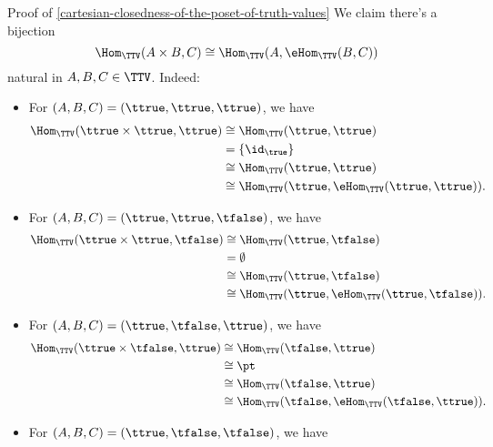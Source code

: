 \begin{Proof}{Proof of \cref{cartesian-closedness-of-the-poset-of-truth-values}}
    We claim there's a bijection
    \[
        \Hom_{\TTV}(A\times B,C)%
        \cong%
        \Hom_{\TTV}(A,\eHom_{\TTV}(B,C))%
    \]%
    natural in $A,B,C\in\TTV$. Indeed:
    \begin{itemize}
        \item For $(A,B,C)=(\ttrue,\ttrue,\ttrue)$, we have
            \begin{align*}
                \Hom_{\TTV}(\ttrue\times\ttrue,\ttrue)    &\cong \Hom_{\TTV}(\ttrue,\ttrue)\\
                                                          &=     \{\id_{\true}\}\\
                                                          &\cong \Hom_{\TTV}(\ttrue,\ttrue)\\
                                                          &\cong \Hom_{\TTV}(\ttrue,\eHom_{\TTV}(\ttrue,\ttrue)).
            \end{align*}
        \item For $(A,B,C)=(\ttrue,\ttrue,\tfalse)$, we have
            \begin{align*}
                \Hom_{\TTV}(\ttrue\times\ttrue,\tfalse)   &\cong \Hom_{\TTV}(\ttrue,\tfalse)\\
                                                          &=     \emptyset\\
                                                          &\cong \Hom_{\TTV}(\ttrue,\tfalse)\\
                                                          &\cong \Hom_{\TTV}(\ttrue,\eHom_{\TTV}(\ttrue,\tfalse)).
            \end{align*}
        \item For $(A,B,C)=(\ttrue,\tfalse,\ttrue)$, we have
            \begin{align*}
                \Hom_{\TTV}(\ttrue\times\tfalse,\ttrue)   &\cong \Hom_{\TTV}(\tfalse,\ttrue)\\
                                                          &\cong \pt\\
                                                          &\cong \Hom_{\TTV}(\tfalse,\ttrue)\\
                                                          &\cong \Hom_{\TTV}(\tfalse,\eHom_{\TTV}(\tfalse,\ttrue)).
            \end{align*}
        \item For $(A,B,C)=(\ttrue,\tfalse,\tfalse)$, we have
            \begin{align*}

\end{align*}
\end{itemize}
\end{Proof}
